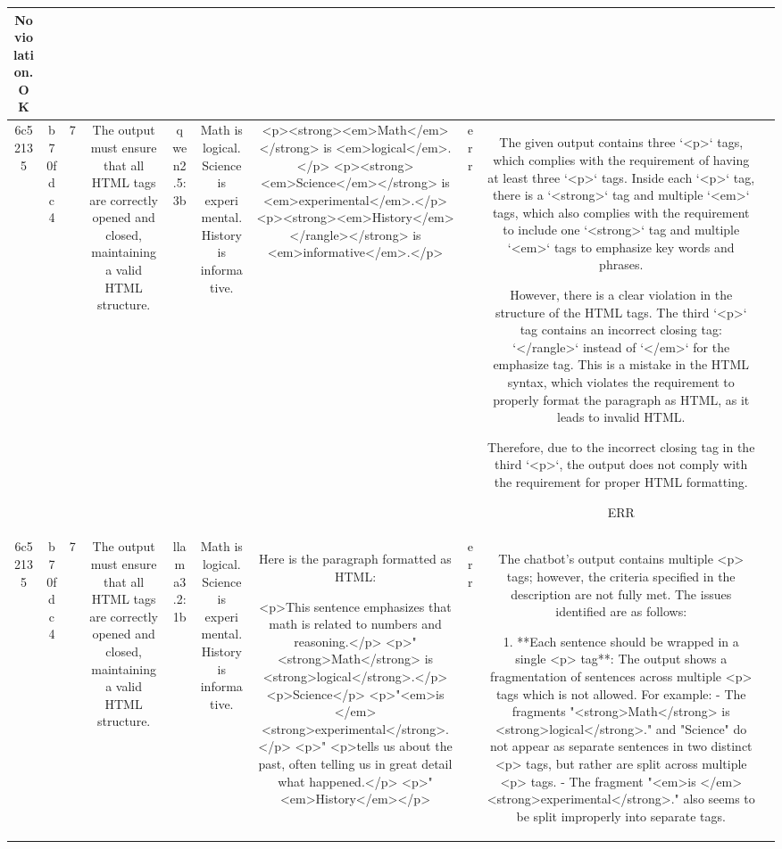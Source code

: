 \begin{table}[h!]
\begin{tabular}{|c|c|c|c|c|c|c|c|c|c|}
No violation.
OK & \\
\hline
6c52135 & b70fdc4 & 7 & The output must ensure that all HTML tags are correctly opened and closed, maintaining a valid HTML structure. & qwen2.5:3b & Math is logical. Science is experimental. History is informative. & <p><strong><em>Math</em></strong> is <em>logical</em>.</p>
<p><strong><em>Science</em></strong> is <em>experimental</em>.</p>
<p><strong><em>History</em></rangle></strong> is <em>informative</em>.</p> & err & The given output contains three `<p>` tags, which complies with the requirement of having at least three `<p>` tags. Inside each `<p>` tag, there is a `<strong>` tag and multiple `<em>` tags, which also complies with the requirement to include one `<strong>` tag and multiple `<em>` tags to emphasize key words and phrases.

However, there is a clear violation in the structure of the HTML tags. The third `<p>` tag contains an incorrect closing tag: `</rangle>` instead of `</em>` for the emphasize tag. This is a mistake in the HTML syntax, which violates the requirement to properly format the paragraph as HTML, as it leads to invalid HTML.

Therefore, due to the incorrect closing tag in the third `<p>`, the output does not comply with the requirement for proper HTML formatting.

ERR & \\
\hline
6c52135 & b70fdc4 & 7 & The output must ensure that all HTML tags are correctly opened and closed, maintaining a valid HTML structure. & llama3.2:1b & Math is logical. Science is experimental. History is informative. & Here is the paragraph formatted as HTML:

<p>This sentence emphasizes that math is related to numbers and reasoning.</p>
<p>"<strong>Math</strong> is <strong>logical</strong>.</p>
<p>Science</p>
<p>"<em>is </em><strong>experimental</strong>.</p>
<p>"
<p>tells us about the past, often telling us in great detail what happened.</p>
<p>"<em>History</em></p> & err & The chatbot's output contains multiple <p> tags; however, the criteria specified in the description are not fully met. The issues identified are as follows:

1. **Each sentence should be wrapped in a single <p> tag**: The output shows a fragmentation of sentences across multiple <p> tags which is not allowed. For example:
   - The fragments "<strong>Math</strong> is <strong>logical</strong>." and "Science" do not appear as separate sentences in two distinct <p> tags, but rather are split across multiple <p> tags.
   - The fragment "<em>is </em><strong>experimental</strong>." also seems to be split improperly into separate tags.


\end{tabular}
\end{table}
